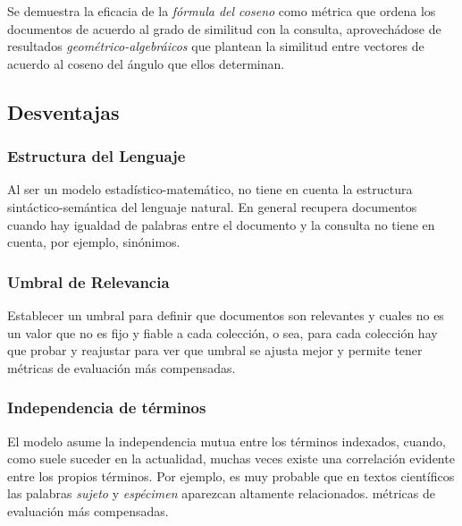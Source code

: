 Se demuestra la eficacia de la \emph{fórmula del coseno} como métrica que
ordena los documentos de acuerdo al grado de similitud con la consulta,
aprovechádose de resultados \emph{geométrico-algebráicos} que plantean la
similitud entre vectores de acuerdo al coseno del ángulo que ellos determinan. 

\subsection{Desventajas}

\subsubsection{Estructura del Lenguaje}

Al ser un modelo estadístico-matemático, no tiene en cuenta la estructura
sintáctico-semántica del lenguaje natural. En general recupera documentos
cuando hay igualdad de palabras entre el documento y la consulta no tiene en
cuenta, por ejemplo, sinónimos.

\subsubsection{Umbral de Relevancia}

Establecer un umbral para definir que documentos son relevantes y cuales no es
un valor que no es fijo y fiable a cada colección, o sea, para cada colección
hay que probar y reajustar para ver que umbral se ajusta mejor y permite tener
métricas de evaluación más compensadas.

\subsubsection{Independencia de términos}

El modelo asume la independencia mutua entre los términos indexados, cuando,
como suele suceder en la actualidad, muchas veces existe una correlación
evidente entre los propios términos. Por ejemplo, es muy probable que en
textos científicos las palabras \emph{sujeto} y \emph{espécimen} aparezcan
altamente relacionados.
métricas de evaluación más compensadas.

